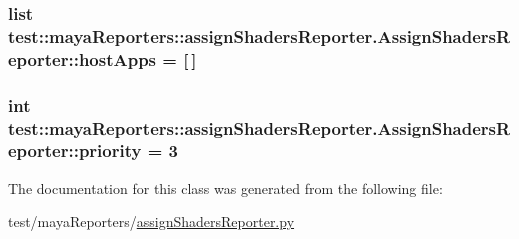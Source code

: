 \hypertarget{classtest_1_1mayaReporters_1_1assignShadersReporter_1_1AssignShadersReporter_aecc144d4f47947b1343eb966fe51c964}{
\subsubsection[{host\-Apps}]{\setlength{\rightskip}{0pt plus 5cm}list {\bf test\-::maya\-Reporters\-::assign\-Shaders\-Reporter.\-Assign\-Shaders\-Reporter\-::host\-Apps} = \mbox{[}$\,$\mbox{]}}}\label{d7/d90/classtest_1_1mayaReporters_1_1assignShadersReporter_1_1AssignShadersReporter_aecc144d4f47947b1343eb966fe51c964}
\hypertarget{classtest_1_1mayaReporters_1_1assignShadersReporter_1_1AssignShadersReporter_a853cf847adf5f5839821099e22bf02f9}{
\subsubsection[{priority}]{\setlength{\rightskip}{0pt plus 5cm}int {\bf test\-::maya\-Reporters\-::assign\-Shaders\-Reporter.\-Assign\-Shaders\-Reporter\-::priority} = 3}}\label{d7/d90/classtest_1_1mayaReporters_1_1assignShadersReporter_1_1AssignShadersReporter_a853cf847adf5f5839821099e22bf02f9}


\-The documentation for this class was generated from the following file\-:\begin{DoxyCompactItemize}
\item 
test/maya\-Reporters/\hyperlink{assignShadersReporter_8py}{assign\-Shaders\-Reporter.\-py}\end{DoxyCompactItemize}
